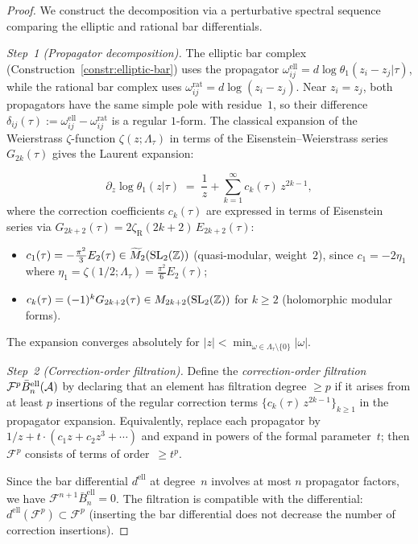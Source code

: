 \begin{proof}
We construct the decomposition via a perturbative spectral sequence
comparing the elliptic and rational bar differentials.

\emph{Step~1 (Propagator decomposition).}
The elliptic bar complex (Construction~\ref{constr:elliptic-bar})
uses the propagator $\omega_{ij}^{\mathrm{ell}} = d\log\theta_1(z_i -
z_j|\tau)$, while the rational bar complex uses $\omega_{ij}^{\mathrm{rat}}
= d\log(z_i - z_j)$.  Near $z_i = z_j$, both propagators have the same
simple pole with residue~$1$, so their difference $\delta_{ij}(\tau) :=
\omega_{ij}^{\mathrm{ell}} - \omega_{ij}^{\mathrm{rat}}$ is a regular
$1$-form.  The classical expansion of the Weierstrass $\zeta$-function
$\zeta(z;\Lambda_\tau)$ in terms of the Eisenstein--Weierstrass series
$G_{2k}(\tau)$ gives the Laurent expansion:

\[
\partial_z\log\theta_1(z|\tau)
\;=\; \frac{1}{z} + \sum_{k=1}^{\infty} c_k(\tau)\,z^{2k-1},
\]
where the correction coefficients $c_k(\tau)$ are expressed in terms
of Eisenstein series via $G_{2k+2}(\tau) = 2\zeta_{\mathrm{R}}(2k+2)\,
E_{2k+2}(\tau)$:
\begin{itemize}
\item $c_1(\tau) = -\tfrac{\pi^2}{3}E_2(\tau) \in
\widetilde{M}_2(\mathrm{SL}_2(\mathbb{Z}))$ (quasi-modular, weight~$2$),
since $c_1 = -2\eta_1$ where
$\eta_1 = \zeta(1/2;\Lambda_\tau) = \tfrac{\pi^2}{6}E_2(\tau)$;
\item $c_k(\tau) = (-1)^k G_{2k+2}(\tau) \in M_{2k+2}(\mathrm{SL}_2(\mathbb{Z}))$
for $k \geq 2$ (holomorphic modular forms).
\end{itemize}
The expansion converges absolutely for $|z| < \min_{\omega \in
\Lambda_\tau \setminus\{0\}} |\omega|$.

\emph{Step~2 (Correction-order filtration).}
Define the \emph{correction-order filtration}
$\mathcal{F}^p \bar{B}^{\mathrm{ell}}_n(\mathcal{A})$ by
declaring that an element has filtration degree $\geq p$ if it arises
from at least $p$ insertions of the regular correction terms
$\{c_k(\tau)\,z^{2k-1}\}_{k \geq 1}$ in the propagator expansion.
Equivalently, replace each propagator by $1/z + t\cdot(c_1 z + c_2 z^3
+ \cdots)$ and expand in powers of the formal parameter~$t$; then
$\mathcal{F}^p$ consists of terms of order~$\geq t^p$.

Since the bar differential $d^{\mathrm{ell}}$ at degree~$n$
involves at most $n$ propagator factors, we have $\mathcal{F}^{n+1}
\bar{B}^{\mathrm{ell}}_n = 0$.  The filtration is compatible
with the differential: $d^{\mathrm{ell}}(\mathcal{F}^p) \subset
\mathcal{F}^p$ (inserting the bar differential does not decrease
the number of correction insertions).


\end{proof}
